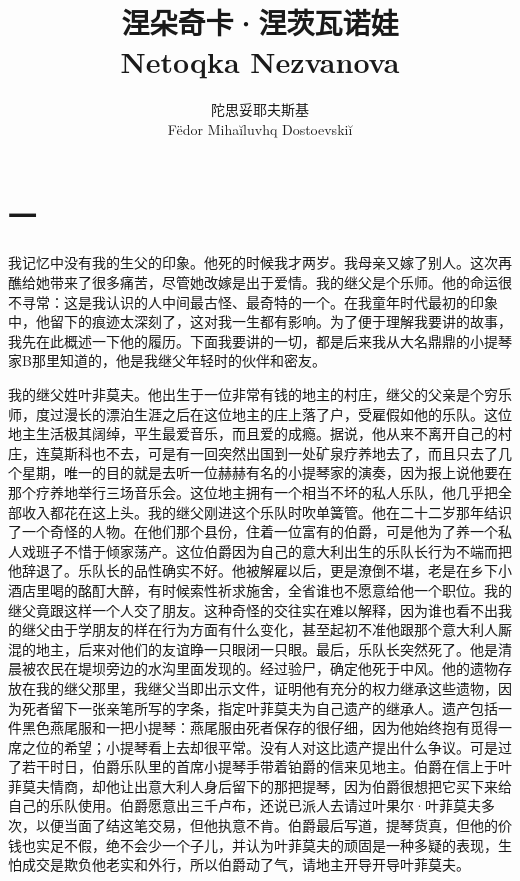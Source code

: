 \documentclass[12pt, UTF8]{ctexbook}
\newcommand\subtitle[1]{{\normalsize #1}}
\begin{document}
\title{涅朵奇卡·涅茨瓦诺娃 \\ \subtitle{\selectfont Netoqka Nezvanova}}
\author{陀思妥耶夫斯基 \\ \small{}\selectfont F\"edor Miha\u{i}luvhq Dostoevski\u{i}}
\maketitle
\newpage

\section*{一}
\par 我记忆中没有我的生父的印象。他死的时候我才两岁。我母亲又嫁了别人。这次再醮给她带来了很多痛苦，尽管她改嫁是出于爱情。我的继父是个乐师。他的命运很不寻常：这是我认识的人中间最古怪、最奇特的一个。在我童年时代最初的印象中，他留下的痕迹太深刻了，这对我一生都有影响。为了便于理解我要讲的故事，我先在此概述一下他的履历。下面我要讲的一切，都是后来我从大名鼎鼎的小提琴家B那里知道的，他是我继父年轻时的伙伴和密友。
\par 我的继父姓叶非莫夫。他出生于一位非常有钱的地主的村庄，继父的父亲是个穷乐师，度过漫长的漂泊生涯之后在这位地主的庄上落了户，受雇假如他的乐队。这位地主生活极其阔绰，平生最爱音乐，而且爱的成瘾。据说，他从来不离开自己的村庄，连莫斯科也不去，可是有一回突然出国到一处矿泉疗养地去了，而且只去了几个星期，唯一的目的就是去听一位赫赫有名的小提琴家的演奏，因为报上说他要在那个疗养地举行三场音乐会。这位地主拥有一个相当不坏的私人乐队，他几乎把全部收入都花在这上头。我的继父刚进这个乐队时吹单簧管。他在二十二岁那年结识了一个奇怪的人物。在他们那个县份，住着一位富有的伯爵，可是他为了养一个私人戏班子不惜于倾家荡产。这位伯爵因为自己的意大利出生的乐队长行为不端而把他辞退了。乐队长的品性确实不好。他被解雇以后，更是潦倒不堪，老是在乡下小酒店里喝的酩酊大醉，有时候索性祈求施舍，全省谁也不愿意给他一个职位。我的继父竟跟这样一个人交了朋友。这种奇怪的交往实在难以解释，因为谁也看不出我的继父由于学朋友的样在行为方面有什么变化，甚至起初不准他跟那个意大利人厮混的地主，后来对他们的友谊睁一只眼闭一只眼。最后，乐队长突然死了。他是清晨被农民在堤坝旁边的水沟里面发现的。经过验尸，确定他死于中风。他的遗物存放在我的继父那里，我继父当即出示文件，证明他有充分的权力继承这些遗物，因为死者留下一张亲笔所写的字条，指定叶菲莫夫为自己遗产的继承人。遗产包括一件黑色燕尾服和一把小提琴：燕尾服由死者保存的很仔细，因为他始终抱有觅得一席之位的希望；小提琴看上去却很平常。没有人对这比遗产提出什么争议。可是过了若干时日，伯爵乐队里的首席小提琴手带着铂爵的信来见地主。伯爵在信上于叶菲莫夫情商，却他让出意大利人身后留下的那把提琴，因为伯爵很想把它买下来给自己的乐队使用。伯爵愿意出三千卢布，还说已派人去请过叶果尔·叶菲莫夫多次，以便当面了结这笔交易，但他执意不肯。伯爵最后写道，提琴货真，但他的价钱也实足不假，绝不会少一个子儿，并认为叶菲莫夫的顽固是一种多疑的表现，生怕成交是欺负他老实和外行，所以伯爵动了气，请地主开导开导叶菲莫夫。
\end{document}
